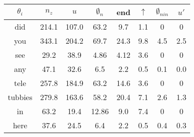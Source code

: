 \begin{tabular}{|c|ccccccc|}
    \hline
    $\theta_i$ &  $n_{z}$  &  $u$   &   $\emptyset_n$    &   end   &  $\uparrow$    &   $\emptyset_{nin}$ & $u'$ \\
    \hline
    \hline
    did  & 214.1  & 107.0  & 63.2  &  9.7    &  1.1   &  0   &  0  \\
    you  & 343.1  & 204.2  & 69.7  &  24.3    &  9.8   &  4.5   &  2.5  \\
    \hline
    see  &  29.2  &  38.9  & 4.86  &  4.12     &  3.6      &  0      &  0    \\
    any  & 47.1  & 32.6  & 6.5  &  2.2    &  0.5   &  0.1   &  0.0  \\
    \hline
    \hline
    tele  & 257.8  & 184.9  & 63.2  &  14.6    &  3.6   &  0    &  0  \\
    tubbies  & 279.8  & 163.6  & 58.2  &  20.4    &  7.1    &  2.6    &  1.3  \\
    \hline
    in  & 63.2   &  19.4  &  12.86     &  9.0      &  7.4      &  0      &  0    \\
    here  & 37.6   &  24.5  &  6.4     &  2.2       &  0.5      &  0.4      &  0.3    \\
    \hline
\end{tabular}
